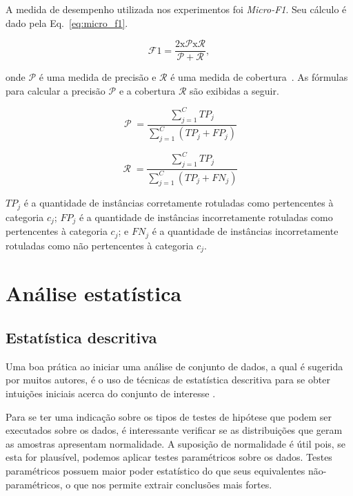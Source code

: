 \documentclass[conference]{IEEEtran}
\begin{document}
A medida de desempenho utilizada nos experimentos foi \textit{Micro-F1}.
Seu cálculo é dado pela Eq.~\ref{eq:micro_f1}.

\begin{equation}
\operatorname{\mathcal{F}{1} = \frac{2 x \mathcal{P} x \mathcal{R}}{\mathcal{P} + \mathcal{R}}},
\label{eq:micro_f1}
\end{equation}

\noindent onde $\mathcal{P}$ é uma medida de precisão e $\mathcal{R}$ é uma medida de cobertura~\cite{chang2008multilabel}. As fórmulas para calcular a precisão $\mathcal{P}$ e a cobertura $\mathcal{R}$ são exibidas a seguir.

\begin{equation}
\operatorname{\mathcal{P}} = \frac{\sum_{j=1}^{C}TP_j}{\sum_{j=1}^{C}(TP_j + FP_j)}
\label{eq:precision}
\end{equation}

\begin{equation}
\operatorname{\mathcal{R}} = \frac{\sum_{j=1}^{C}TP_j}{\sum_{j=1}^{C}(TP_j + FN_j)}
\label{eq:recall}
\end{equation}

$TP_j$ é a quantidade de instâncias corretamente rotuladas como pertencentes à categoria $c_j$; $FP_j$ é a quantidade de instâncias incorretamente rotuladas como pertencentes à categoria $c_j$; e $FN_j$ é a quantidade de instâncias incorretamente rotuladas como não pertencentes à categoria $c_j$. 

\section{Análise estatística}
\label{sec:analise}

\subsection{Estatística descritiva}
\label{sec:estat_descr}

Uma boa prática ao iniciar uma análise de conjunto de dados, a qual é sugerida por muitos autores, é o uso de técnicas de estatística descritiva para se obter intuições iniciais acerca do conjunto de interesse \cite{montgomery2010applied}.

Para se ter uma indicação sobre os tipos de testes de hipótese que podem ser executados sobre os dados, é interessante verificar se as distribuições que geram as amostras apresentam normalidade.
A suposição de normalidade é útil pois, se esta for plausível, podemos aplicar testes paramétricos sobre os dados.
Testes paramétricos possuem maior poder estatístico do que seus equivalentes não-paramétricos, o que nos permite extrair conclusões mais fortes.
\end{document}
